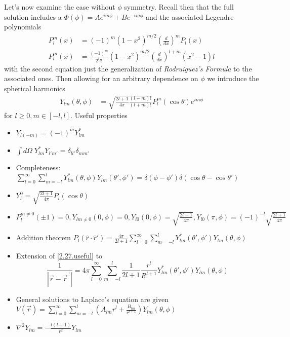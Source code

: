 \documentclass[10pt]{report}
\newcommand{\rd}[2]{\frac{d#1}{d#2}}
\newcommand{\pvec}[1]{\vec{#1}^{\,\prime}}
\newcommand{\abs}[1]{\left|#1\right|}
\begin{document}
Let's now examine the case without $\phi$ symmetry. Recall then that the full solution includes a $\Phi(\phi) = Ae^{im\phi} + Be^{-im\phi}$ and the associated Legendre polynomials
\begin{align}
    P_l^m(x) &= (-1)^m(1-x^2)^{m/2}\left( \rd{}{x} \right)^mP_l(x)\\
    P_l^m(x) &= \frac{(-1)^m}{2^ll!}(1-x^2)^{m/2} \left( \rd{}{x} \right)^{l+m}\left( x^2-1 \right)l
\end{align}
with the second equation just the generalization of \emph{Rodruiguez's Formula} to the associated ones. Then allowing for an arbitrary dependence on $\phi$ we introduce the spherical harmonics
\begin{align}
    Y_{lm}(\theta, \phi) &= \sqrt{\frac{2l+1}{4\pi}\frac{(l-m)!}{(l+m)!}}P_l^m(\cos\theta)e^{im\phi}
\end{align}
for $l \geq 0, m \in [-l, l]$. Useful properties
\begin{itemize}
    \item $Y_{l(-m)} = (-1)^mY_{lm}^*$
    \item $\int d\Omega\; Y_{lm}^*Y_{l'm'} = \delta_{ll'}\delta_{mm'}$
    \item Completeness: $\sum_{l=0}^{\infty}\sum_{m=-l}^{l}Y_{lm}^*(\theta,\phi)Y_{lm}(\theta', \phi') = \delta(\phi - \phi')\delta(\cos\theta - \cos\theta')$
    \item $Y_l^0 = \sqrt{\frac{2l+1}{4\pi}}P_l(\cos\theta)$
    \item $P_l^{m\neq 0}(\pm 1) = 0, Y_{lm\neq 0}(0,\phi) = 0, Y_{l0}(0,\phi) = \sqrt{\frac{2l+1}{4\pi}}, Y_{l0}(\pi,\phi) = \left( -1 \right)^{-l}\sqrt{\frac{2l+1}{4\pi}}$
    \item Addition theorem $P_l(\hat{r}\cdot\hat{r}') = \frac{4\pi}{2l+1}\sum_{l=0}^{\infty}\sum_{m=-l}^{l}Y_{lm}^*(\theta', \phi')Y_{lm}(\theta,\phi)$
    \item Extension of \eqref{2.27.useful} to
        \begin{equation}
            \frac{1}{\abs{\vec{r} - \pvec{r}}} = 4\pi\sum_{l=0}^{\infty}\sum_{m=-l}^{l}\frac{1}{2l+1}\frac{r^l}{R^{l+1}}Y_{lm}^*(\theta', \phi')Y_{lm}(\theta,\phi)
            \label{2.27.useful2}
        \end{equation}
    \item General solutions to Laplace's equation are given $V(\vec{r}) = \sum_{l=0}^{\infty}\sum_{m=-l}^{l}\left( A_{lm}r^l + \frac{B_{lm}}{r^{l+1}} \right)Y_{lm}(\theta,\phi)$
    \item $\nabla^2 Y_{lm} = -\frac{l(l+1)}{r^2}Y_{lm}$
\end{itemize}
\end{document}
